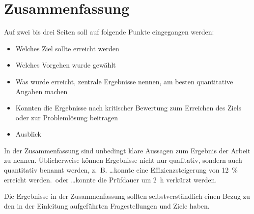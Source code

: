 \chapter{Zusammenfassung}
\label{cha:zusammenfassung}

Auf zwei bis drei Seiten soll auf folgende Punkte eingegangen werden:

\begin{itemize}
	\item Welches Ziel sollte erreicht werden
	\item Welches Vorgehen wurde gewählt
	\item Was wurde erreicht, zentrale Ergebnisse nennen, am besten quantitative Angaben machen
	\item Konnten die Ergebnisse nach kritischer Bewertung zum Erreichen des Ziels oder zur Problemlösung beitragen
	\item  Ausblick
\end{itemize}

In der Zusammenfassung sind unbedingt klare Aussagen zum Ergebnis der Arbeit zu nennen. Üblicherweise können Ergebnisse nicht nur qualitativ, sondern auch quantitativ benannt werden, z.~B. \glqq \ldots konnte eine Effizienzsteigerung von \SI{12}{\percent} erreicht werden.\grqq~oder \glqq \ldots konnte die Prüfdauer um \SI{2}{\hour} verkürzt werden\grqq.

Die Ergebnisse in der Zusammenfassung sollten selbstverständlich einen Bezug zu den in der Einleitung aufgeführten Fragestellungen und Ziele haben.
